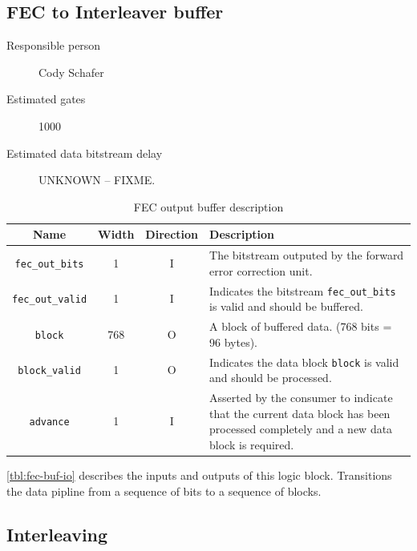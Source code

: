 \documentclass[dvips,10pt,twocolumn]{article}
\begin{document}

\subsection{FEC to Interleaver buffer}
\label{sec:fec_buffer}
\begin{description}
	\item[Responsible person] Cody Schafer 
	\item[Estimated gates] 1000
	\item[Estimated data bitstream delay] UNKNOWN -- FIXME.
\end{description}

\begin{table} \begin{tabularx}{\textwidth}{c|c|c|X}
	\label{tbl:fec-buf-io}
	Name & Width & Direction & Description \\ \hline

	\texttt{fec\_out\_bits} & 1 & I & The bitstream outputed by the
	forward error correction unit. \\

	\texttt{fec\_out\_valid} & 1 & I & Indicates the bitstream
	\texttt{fec\_out\_bits} is valid and should be buffered. \\


	\texttt{block} & 768 & O & A block of buffered data. (768 bits = 96
	bytes). \\

	\texttt{block\_valid} & 1 & O & Indicates the data block
	\texttt{block} is valid and should be processed. \\

	\texttt{advance} & 1 & I & Asserted by the consumer to indicate that
	the current data block has been processed completely and a new data
	block is required. \\

\end{tabularx} \caption{FEC output buffer description} \end{table}

\autoref{tbl:fec-buf-io} describes the inputs and outputs of this logic
block.
Transitions the data pipline from a sequence of bits to a sequence of
blocks.


	\subsection{Interleaving}
	\label{sec:interleaving}
	
\end{document}
